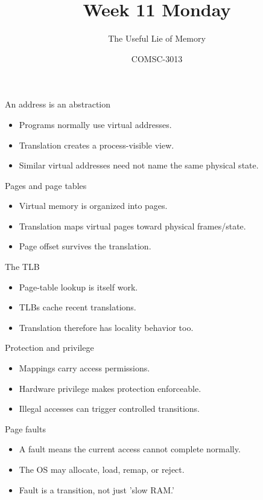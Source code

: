 \documentclass{beamer}
\title{Week 11 Monday}\subtitle{The Useful Lie of Memory}\author{COMSC-3013}\date{}
\begin{document}
\begin{frame}\titlepage\end{frame}
\begin{frame}{An address is an abstraction}\begin{itemize}\item Programs normally use virtual addresses.\item Translation creates a process-visible view.\item Similar virtual addresses need not name the same physical state.\end{itemize}\end{frame}
\begin{frame}{Pages and page tables}\begin{itemize}\item Virtual memory is organized into pages.\item Translation maps virtual pages toward physical frames/state.\item Page offset survives the translation.\end{itemize}\end{frame}
\begin{frame}{The TLB}\begin{itemize}\item Page-table lookup is itself work.\item TLBs cache recent translations.\item Translation therefore has locality behavior too.\end{itemize}\end{frame}
\begin{frame}{Protection and privilege}\begin{itemize}\item Mappings carry access permissions.\item Hardware privilege makes protection enforceable.\item Illegal accesses can trigger controlled transitions.\end{itemize}\end{frame}
\begin{frame}{Page faults}\begin{itemize}\item A fault means the current access cannot complete normally.\item The OS may allocate, load, remap, or reject.\item Fault is a transition, not just 'slow RAM.'\end{itemize}\end{frame}
\end{document}
